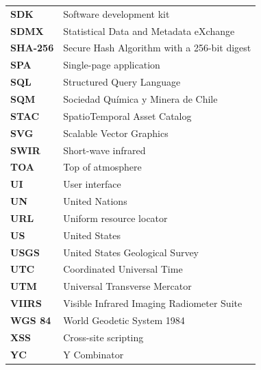 {\begin{longtable}{>{\raggedright\arraybackslash}p{3.68cm}>{\raggedright\arraybackslash}p{10.52cm}}
\textbf{SDK} & Software development kit \\
\textbf{SDMX} & Statistical Data and Metadata eXchange \\
\textbf{SHA-256} & Secure Hash Algorithm with a 256-bit digest \\
\textbf{SPA} & Single-page application \\
\textbf{SQL} & Structured Query Language \\
\textbf{SQM} & Sociedad Química y Minera de Chile \\
\textbf{STAC} & SpatioTemporal Asset Catalog \\
\textbf{SVG} & Scalable Vector Graphics \\
\textbf{SWIR} & Short-wave infrared \\
\textbf{TOA} & Top of atmosphere \\
\textbf{UI} & User interface \\
\textbf{UN} & United Nations \\
\textbf{URL} & Uniform resource locator \\
\textbf{US} & United States \\
\textbf{USGS} & United States Geological Survey \\
\textbf{UTC} & Coordinated Universal Time \\
\textbf{UTM} & Universal Transverse Mercator \\
\textbf{VIIRS} & Visible Infrared Imaging Radiometer Suite \\
\textbf{WGS 84} & World Geodetic System 1984 \\
\textbf{XSS} & Cross-site scripting \\
\textbf{YC} & Y Combinator \\
\bottomrule
\end{longtable}
}
